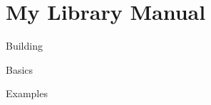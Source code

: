 \chapter{My Library Manual }
\hypertarget{index}{}\label{index}

\begin{DoxyItemize}
\item Building
\item Basics
\item Examples 
\end{DoxyItemize}